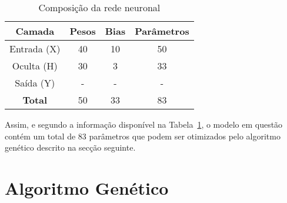 \begin{table}[htpb]
    \centering
    \begin{tabular}{cccc}
        \hline
        \textbf{Camada} & \textbf{Pesos} & \textbf{Bias} & \textbf{Parâmetros} \\ \hline
        Entrada (X)    & 40    & 10   & 50         \\
        Oculta (H)     & 30    & 3    & 33         \\
        Saída (Y)      & -     & -    & -          \\ \hline
        \textbf{Total} & 50    & 33   & 83         \\ \hline
    \end{tabular}
    \caption{Composição da rede neuronal}
    \label{tab:nn_summary}
\end{table}

Assim, e segundo a informação disponível na Tabela~\ref{tab:nn_summary}, o modelo em questão contém um total de 83 parâmetros que podem ser otimizados pelo algoritmo genético descrito na secção seguinte.


\section{Algoritmo Genético}\label{sec:gen_alg}
